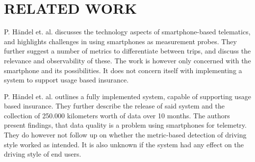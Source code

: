 \section{RELATED WORK}\label{sec:relatedwork}

P. Händel et. al. discusses the technology aspects of smartphone-based telematics, and highlights challenges in using smartphones as measurement probes\citep{art:insurtelematics}. They further suggest a number of metrics to differentiate between trips, and discuss the relevance and observability of these. The work is however only concerned with the smartphone and its possibilities. It does not concern itself with implementing a system to support usage based insurance.

P. Händel et. al. outlines a fully implemented system, capable of supporting usage based insurance\citep{art:smartphones_for_monitoring_and_ubi}. They further describe the release of said system and the collection of 250.000 kilometers worth of data over 10 months. The authors present findings, that data quality is a problem using smartphones for telemetry. They do however not follow up on whether the metric-based detection of driving style worked as intended. It is also unknown if the system had any effect on the driving style of end users.